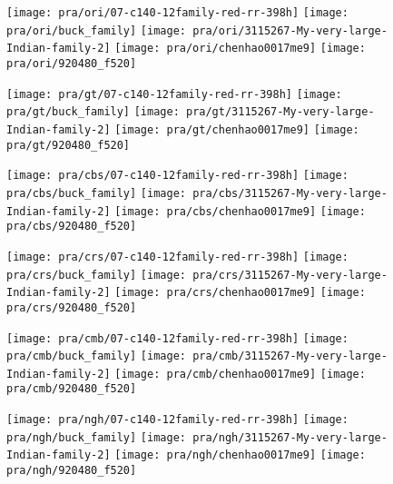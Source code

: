 \begin{figure*}[!htb]
    \centering
    \begin{subfigure}[t]{0.15\textwidth}
        \texttt{[image: pra/ori/07-c140-12family-red-rr-398h]}
        \texttt{[image: pra/ori/buck\_family]}
        \texttt{[image: pra/ori/3115267-My-very-large-Indian-family-2]}
        \texttt{[image: pra/ori/chenhao0017me9]}
        \texttt{[image: pra/ori/920480\_f520]}
        \caption{}
    \end{subfigure}
    \begin{subfigure}[t]{0.15\textwidth}
        \texttt{[image: pra/gt/07-c140-12family-red-rr-398h]}
        \texttt{[image: pra/gt/buck\_family]}
        \texttt{[image: pra/gt/3115267-My-very-large-Indian-family-2]}
        \texttt{[image: pra/gt/chenhao0017me9]}
        \texttt{[image: pra/gt/920480\_f520]}
        \caption{}
    \end{subfigure}
    \begin{subfigure}[t]{0.15\textwidth}
        \texttt{[image: pra/cbs/07-c140-12family-red-rr-398h]}
        \texttt{[image: pra/cbs/buck\_family]}
        \texttt{[image: pra/cbs/3115267-My-very-large-Indian-family-2]}
        \texttt{[image: pra/cbs/chenhao0017me9]}
        \texttt{[image: pra/cbs/920480\_f520]}
        \caption{}
    \end{subfigure}
    \begin{subfigure}[t]{0.15\textwidth}
        \texttt{[image: pra/crs/07-c140-12family-red-rr-398h]}
        \texttt{[image: pra/crs/buck\_family]}
        \texttt{[image: pra/crs/3115267-My-very-large-Indian-family-2]}
        \texttt{[image: pra/crs/chenhao0017me9]}
        \texttt{[image: pra/crs/920480\_f520]}
        \caption{}
    \end{subfigure}
    \begin{subfigure}[t]{0.15\textwidth}
        \texttt{[image: pra/cmb/07-c140-12family-red-rr-398h]}
        \texttt{[image: pra/cmb/buck\_family]}
        \texttt{[image: pra/cmb/3115267-My-very-large-Indian-family-2]}
        \texttt{[image: pra/cmb/chenhao0017me9]}
        \texttt{[image: pra/cmb/920480\_f520]}
        \caption{}
    \end{subfigure}
    \begin{subfigure}[t]{0.15\textwidth}
        \texttt{[image: pra/ngh/07-c140-12family-red-rr-398h]}
        \texttt{[image: pra/ngh/buck\_family]}
        \texttt{[image: pra/ngh/3115267-My-very-large-Indian-family-2]}
        \texttt{[image: pra/ngh/chenhao0017me9]}
        \texttt{[image: pra/ngh/920480\_f520]}
        \caption{}
    \end{subfigure}


\end{figure*}
